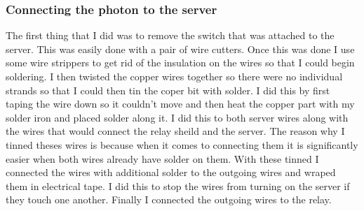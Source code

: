 \documentclass{article}
\begin{document}
\subsubsection{Connecting the photon to the server}
The first thing that I did was to remove the switch that was attached to the server. This was easily
done with a pair of wire cutters. Once this was done I use some wire strippers to get rid of the
insulation on the wires so that I could begin soldering. I then twisted the copper wires together
so there were no individual strands so that I could then tin the coper bit with solder. I did this
by first taping the wire down so it couldn't move and then heat the copper part with my solder iron
and placed solder along it. I did this to both server wires along with the wires that would connect
the relay sheild and the server. The reason why I tinned theses wires is because when it comes
to connecting them it is significantly easier when both wires already have solder on them. With these
tinned I connected the wires with additional solder to the outgoing wires and wraped them in electrical tape.
I did this to stop the wires from turning on the server if they touch one another. Finally I connected the
outgoing wires to the relay.
\end{document}
